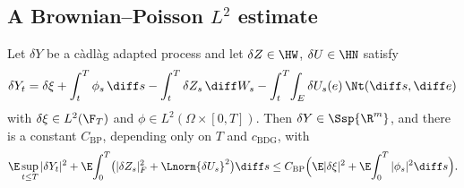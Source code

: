 \subsection{A Brownian--Poisson \texorpdfstring{$L^2$}{L2} estimate}

\begin{lemma}\label{lem:bpbsde}
Let $\delta Y$ be a c\`adl\`ag adapted process and let $\delta Z\in\HW$, $\delta U\in\HN$
satisfy
\begin{equation}\label{eq:dYlin}
\delta Y_t=\delta\xi+\int_t^T\phi_s\,\diff s-\int_t^T\delta Z_s\,\diff W_s-\int_t^T\!\int_E\delta U_s(e)\,\Nt(\diff s,\diff e)
\end{equation}
with $\delta\xi\in L^2(\F_T)$ and $\phi\in L^2(\Omega\times[0,T])$. Then
$\delta Y\in\Ssp{\R^m}$, and there is a constant
$C_{\mathrm{BP}}$, depending only on $T$ and $c_{\mathrm{BDG}}$, with
\[
\E\sup_{t\le T}|\delta Y_t|^2+\E\!\int_0^T\!\big(|\delta Z_s|_F^2+\Lnorm{\delta U_s}^2\big)\diff s
\le C_{\mathrm{BP}}\Big(\E|\delta\xi|^2+\E\!\int_0^T|\phi_s|^2\diff s\Big).
\]
\end{lemma}

